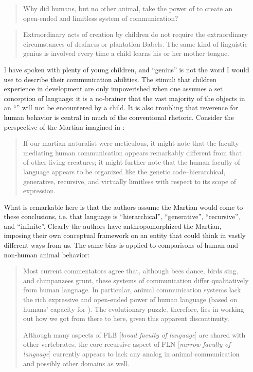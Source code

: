 \begin{quote}
Why did humans, but no other animal, take the power of  to create an open-ended and limitless system of communication? \citep{HauserEtAl2002}
\end{quote}

\begin{quote} 
Extraordinary acts of creation by children do not require the extraordinary circumstances of deafness or plantation Babels. The same kind of linguistic genius is involved every time a child learns his or her mother tongue. \citep{Pinker2003}
\end{quote}

  I have spoken with plenty of young children, and “genius” is not the word I would use to describe their communication abilities. The stimuli that children experience in development are only impoverished when one assumes a set conception of language: it is a no-brainer that the vast majority of the objects in an “” will not be encountered by a child. It is also troubling that reverence for human behavior is central in much of the conventional rhetoric. Consider the perspective of the Martian imagined in \citet{HauserEtAl2002}:


\begin{quote}
If our martian naturalist were meticulous, it might note that the faculty mediating human communication appears remarkably different from that of other living creatures; it might further note that the human faculty of language appears to be organized like the genetic code--hierarchical, generative, recursive, and virtually limitless with respect to its scope of expression. \citep{HauserEtAl2002}
\end{quote}

  What is remarkable here is that the authors assume the Martian would come to these conclusions, i.e. that language is “hierarchical”, “generative”, “recursive”, and “infinite”. Clearly the authors have anthropomorphized the Martian, imposing their own conceptual framework on an entity that could think in vastly different ways from us. The same bias is applied to comparisons of human and non-human animal behavior:

\begin{quote}
Most current commentators agree that, although bees dance, birds sing, and chimpanzees grunt, these systems of communication differ qualitatively from human language. In particular, animal communication systems lack the rich expressive and open-ended power of human language (based on humans' capacity for ). The evolutionary puzzle, therefore, lies in working out how we got from there to here, given this apparent discontinuity. \citep{HauserEtAl2002}

Although many aspects of FLB [\textit{broad faculty of language}] are shared with other vertebrates, the core recursive aspect of FLN [\textit{narrow faculty of language}] currently appears to lack any analog in animal communication and possibly other domains as well. \citep{HauserEtAl2002}
\end{quote}

